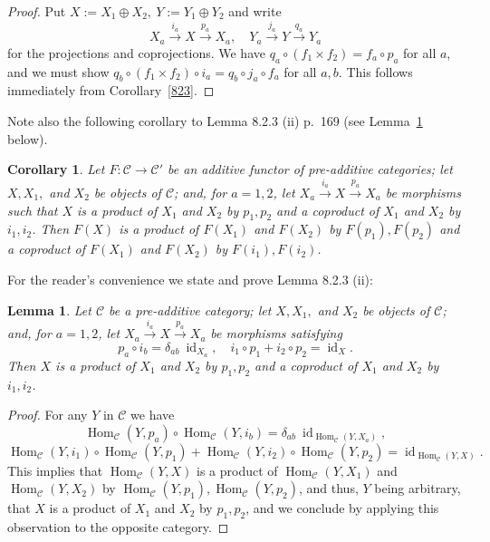\documentclass[12pt]{article}
\newtheorem{lem}[thm]{Lemma}
\newtheorem{cor}[thm]{Corollary}
\theoremstyle{remark}
\theoremstyle{definition}
\newcommand{\C}{\mathcal C}
\newcommand{\xr}{\xrightarrow}
\DeclareMathOperator{\id}{id}
\DeclareMathOperator{\Hom}{Hom}%
\begin{document}
\begin{proof}
Put $X:=X_1\oplus X_2,\ Y:=Y_1\oplus Y_2$ and write 
$$
X_a\xr{i_a}X\xr{p_a}X_a,\quad Y_a\xr{j_a}Y\xr{q_a}Y_a
$$ 
for the projections and coprojections. We have $q_a\circ(f_1\times f_2)=f_a\circ p_a$ for all $a$, and we must show $q_b\circ (f_1\times f_2)\circ i_a=q_b\circ j_a\circ f_a$ for all $a,b$. This follows immediately from Corollary~\ref{823}.
\end{proof}

Note also the following corollary to Lemma 8.2.3 (ii) p.~169 (see Lemma~\ref{823ii} below). 
%
\begin{cor}\label{823b}
Let $F:\C\to\C'$ be an additive functor of pre-additive categories; let $X,X_1,$ and $X_2$ be objects of $\C$; and, for $a=1,2$, let $X_a\xr{i_a}X\xr{p_a}X_a$ be morphisms such that $X$ is a product of $X_1$ and $X_2$ by $p_1,p_2$ and a coproduct of $X_1$ and $X_2$ by $i_1,i_2$. Then $F(X)$ is a product of $F(X_1)$ and $F(X_2)$ by $F(p_1),F(p_2)$ and a coproduct of $F(X_1)$ and $F(X_2)$ by $F(i_1),F(i_2)$. 
\end{cor}

For the reader's convenience we state and prove Lemma 8.2.3 (ii):
%
\begin{lem}\label{823ii}
Let $\C$ be a pre-additive category; let $X,X_1,$ and $X_2$ be objects of $\C$; and, for $a=1,2$, let $X_a\xr{i_a}X\xr{p_a}X_a$ be morphisms satisfying 
$$
p_a\circ i_b=\delta_{ab}\ \id_{X_a},\quad i_1\circ p_1+i_2\circ p_2=\id_X.
$$
Then $X$ is a product of $X_1$ and $X_2$ by $p_1,p_2$ and a coproduct of $X_1$ and $X_2$ by $i_1,i_2$. 
\end{lem}
%
\begin{proof}
For any $Y$ in $\C$ we have 
$$
\Hom_\C(Y,p_a)\circ\Hom_\C(Y,i_b)=\delta_{ab}\ \id_{\Hom_\C(Y,X_a)},
$$ 
$$
\Hom_\C(Y,i_1)\circ\Hom_\C(Y,p_1)+\Hom_\C(Y,i_2)\circ\Hom_\C(Y,p_2)=\id_{\Hom_\C(Y,X)}.
$$ 
This implies that $\Hom_\C(Y,X)$ is a product of $\Hom_\C(Y,X_1)$ and $\Hom_\C(Y,X_2)$ by $\Hom_\C(Y,p_1),\Hom_\C(Y,p_2)$, and thus, $Y$ being arbitrary, that $X$ is a product of $X_1$ and $X_2$ by $p_1,p_2$, and we conclude by applying this observation to the opposite category.
\end{proof}
%
\end{document}
